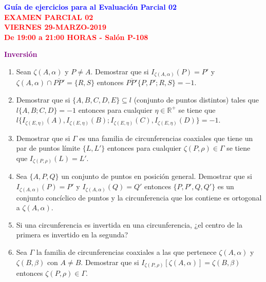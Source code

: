 \documentclass[12pt]{report}
\numberwithin{section}{chapter}
\newcommand{\R}{\mathbb R}
\begin{document}
\begin{center}
\textcolor{blue}{\textbf{\large Guía de ejercicios para al Evaluación Parcial 02}}\\
\vspace{0.5 cm}
\textcolor{red}{\textbf{\large EXAMEN PARCIAL 02 \\ VIERNES
29-MARZO-2019\\ De 19:00 a 21:00 HORAS - Salón P-108}}
\end{center}


\begin{center}
\textcolor{purple}{\textbf{\large Inversión}}
\end{center}

\begin{enumerate}

\item Sean $\zeta(A, \alpha)$ y $P \neq A$. Demostrar que si $I_{\zeta(A, \alpha)} (P) = P'$ y $\zeta(A, \alpha) \cap \overline{PP'} = \{ R, S \}$ entonces $\overline{PP'}\{P, P'; R, S\} = -1$.

\item Demostrar que si $\{A,B,C,D,E\} \subseteq l$ (conjunto de puntos distintos) tales que $l\{A,B;C,D\}=-1$ entonces para cualquier $\eta \in \R^+$ se tiene que $l\{I_{\zeta(E,\eta)}(A), I_{\zeta(E,\eta)}(B);I_{\zeta(E,\eta)}(C),I_{\zeta(E,\eta)}(D)\}=-1$.

\item Demostrar que si $\Gamma$ es una familia de circunferencias coaxiales que tiene un par de puntos límite $\{L,L'\}$ entonces para cualquier $\zeta(P,\rho) \in \Gamma$ se tiene que $I_{\zeta(P, \rho)}(L) = L'$.

\item Sea $\{A, P, Q\}$ un conjunto de puntos en posición general. Demostrar que si $I_{\zeta(A, \alpha)} (P) = P'$ y \break $I_{\zeta(A, \alpha)} (Q) = Q'$ entonces $\{P, P', Q, Q'\}$ es un conjunto concíclico de puntos y la circunferencia que los contiene es ortogonal a $\zeta(A, \alpha)$.

\item Si una circunferencia es invertida en una circunferencia, ¿el centro de la primera es invertido en la segunda?

\item Sea $\Gamma$ la familia de circunferencias coaxiales a las que pertenece $\zeta(A, \alpha)$ y $\zeta(B, \beta)$ con $A \neq B$. Demostrar que si $I_{\zeta(P, \rho)} [\zeta(A, \alpha)] = \zeta(B, \beta)$ entonces $\zeta(P, \rho) \in \Gamma$.


\end{enumerate}
\end{document}
